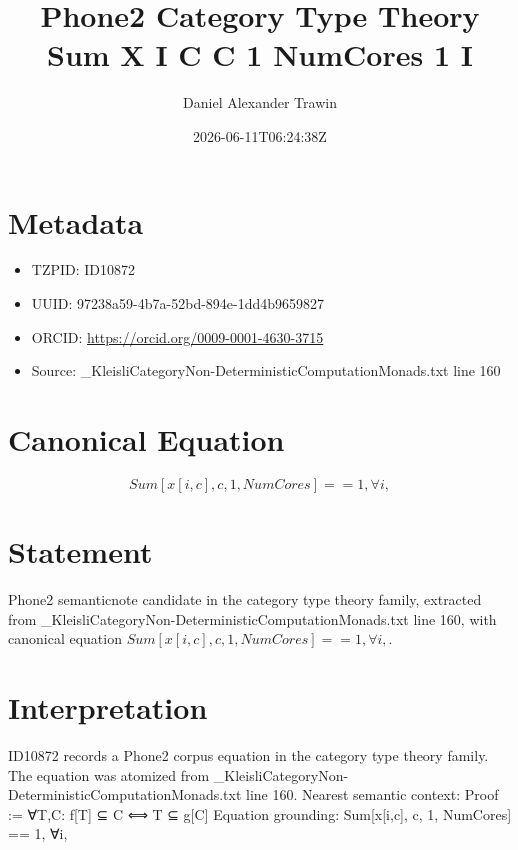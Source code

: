 \documentclass[11pt]{article}
\title{Phone2 Category Type Theory Sum X I C C 1 NumCores 1 I}
\author{Daniel Alexander Trawin}
\date{2026-06-11T06:24:38Z}
\begin{document}
\maketitle
\section*{Metadata}
\begin{itemize}
\item TZPID: ID10872
\item UUID: 97238a59-4b7a-52bd-894e-1dd4b9659827
\item ORCID: \url{https://orcid.org/0009-0001-4630-3715}
\item Source: _KleisliCategoryNon-DeterministicComputationMonads.txt line 160
\end{itemize}
\section*{Canonical Equation}
\[
Sum[x[i,c], {c, 1, NumCores}] == 1, ∀i,
\]
\section*{Statement}
Phone2 semanticnote candidate in the category type theory family, extracted from _KleisliCategoryNon-DeterministicComputationMonads.txt line 160, with canonical equation $Sum[x[i,c], {c, 1, NumCores}] == 1, ∀i,$.
\section*{Interpretation}
ID10872 records a Phone2 corpus equation in the category type theory family. The equation was atomized from _KleisliCategoryNon-DeterministicComputationMonads.txt line 160. Nearest semantic context: Proof := ∀T,C: f[T] ⊆ C ⟺ T ⊆ g[C] Equation grounding: Sum[x[i,c], {c, 1, NumCores}] == 1, ∀i,
\end{document}
